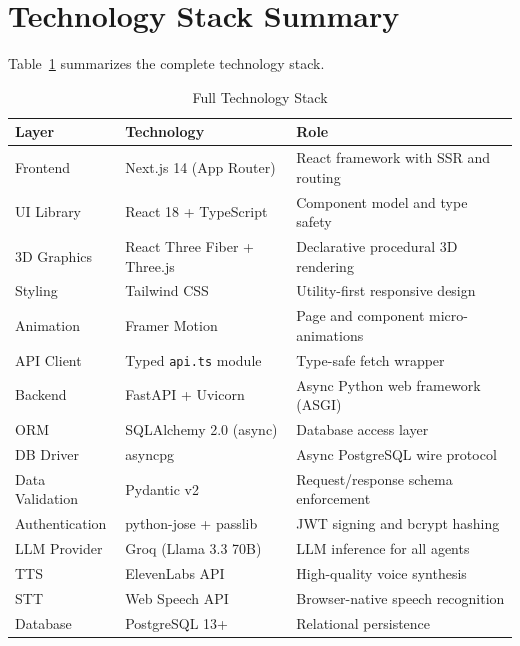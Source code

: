 \documentclass[11pt,a4paper]{report}
\begin{document}
\section{Technology Stack Summary}

Table~\ref{tab:techstack} summarizes the complete technology stack.

\begin{table}[H]
\centering
\caption{Full Technology Stack}
\label{tab:techstack}
\renewcommand{\arraystretch}{1.3}
\begin{tabular}{p{3.5cm} p{3.5cm} p{6.5cm}}
\toprule
\textbf{Layer} & \textbf{Technology} & \textbf{Role} \\
\midrule
\rowcolor{rowgray}
Frontend & Next.js 14 (App Router) & React framework with SSR and routing \\
UI Library & React 18 + TypeScript & Component model and type safety \\
\rowcolor{rowgray}
3D Graphics & React Three Fiber + Three.js & Declarative procedural 3D rendering \\
Styling & Tailwind CSS & Utility-first responsive design \\
\rowcolor{rowgray}
Animation & Framer Motion & Page and component micro-animations \\
API Client & Typed \texttt{api.ts} module & Type-safe fetch wrapper \\
\midrule
\rowcolor{rowgray}
Backend & FastAPI + Uvicorn & Async Python web framework (ASGI) \\
ORM & SQLAlchemy 2.0 (async) & Database access layer \\
\rowcolor{rowgray}
DB Driver & asyncpg & Async PostgreSQL wire protocol \\
Data Validation & Pydantic v2 & Request/response schema enforcement \\
\rowcolor{rowgray}
Authentication & python-jose + passlib & JWT signing and bcrypt hashing \\
\midrule
\rowcolor{rowgray}
LLM Provider & Groq (Llama 3.3 70B) & LLM inference for all agents \\
TTS & ElevenLabs API & High-quality voice synthesis \\
\rowcolor{rowgray}
STT & Web Speech API & Browser-native speech recognition \\
Database & PostgreSQL 13+ & Relational persistence \\
\bottomrule
\end{tabular}
\end{table}
\end{document}
